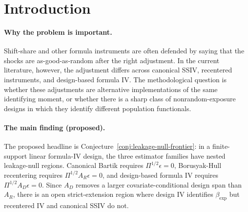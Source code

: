 \documentclass[11pt]{article}
\theoremstyle{definition}
\theoremstyle{plain}
\theoremstyle{remark}
\begin{document}
\begin{abstract}
Formula-IV papers now give three adjacent routes for shift-share identification: canonical shock-level SSIV, recentered instruments for nonrandom exposure, and design-based formula IV that conditions on a known shock assignment process.  This proposal asks when the latter two are genuinely different rather than notational variants on the same population moment.  The proposed kernel is a leakage-null projection theorem: after exposure aggregation, canonical Bartik, recentered IV, and design IV are consistent exactly when the leakage vector \(\epsilon\) lies in three nested null spaces, \(\ker(\Pi^{1/2})\), \(\ker(\Pi^{1/2}A_R)\), and \(\ker(\Pi^{1/2}A_D)\).  The flagship conjecture is that the middle and largest null spaces are sharply separated on an open class of finite-support formula designs, so design conditioning can identify \(\beta_{\exp}\) in cases where recentering still converges to a biased limit.  Resolving this would give practitioners a finite-support matrix diagnostic for whether recentering has actually removed the harmful covariate-conditional shock-mean leakage.
\end{abstract}

\section{Introduction}
\paragraph{Why the problem is important.}
Shift-share and other formula instruments are often defended by saying that the shocks are as-good-as-random after the right adjustment.  In the current literature, however, the adjustment differs across canonical SSIV, recentered instruments, and design-based formula IV.  The methodological question is whether these adjustments are alternative implementations of the same identifying moment, or whether there is a sharp class of nonrandom-exposure designs in which they identify different population functionals.

\paragraph{The main finding (proposed).}
The proposed headline is Conjecture~\ref{conj:leakage-null-frontier}: in a finite-support linear formula-IV design, the three estimator families have nested leakage-null regions.  Canonical Bartik requires \(\Pi^{1/2}\epsilon=0\), Borusyak-Hull recentering requires \(\Pi^{1/2}A_R\epsilon=0\), and design-based formula IV requires \(\Pi^{1/2}A_D\epsilon=0\).  Since \(A_D\) removes a larger covariate-conditional design span than \(A_R\), there is an open strict-extension region where design IV identifies \(\beta_{\exp}\) but recentered IV and canonical SSIV do not.
\end{document}
